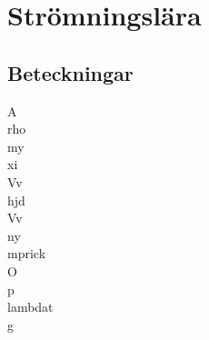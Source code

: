 \chapter{Strömningslära}
\section*{Beteckningar}
\acrfull{A} \\
\acrfull{rho} \\
\acrfull{my} \\
\acrfull{xi} \\
\acrfull{Vv}\\
\acrfull{hjd} \\
\acrfull{Vv} \\
\acrfull{ny} \\
\acrfull{mprick} \\
\acrfull{O} \\
\acrfull{p} \\
\acrfull{lambdat} \\
\acrfull{g}

